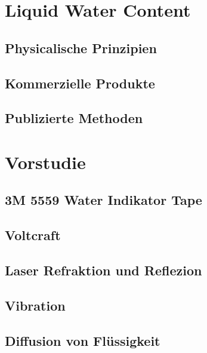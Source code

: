 \documentclass[a4paper,12pt]{article}
\begin{document}
\section{Liquid Water Content}
\subsection{Physicalische Prinzipien}

\subsection{Kommerzielle Produkte}

\subsection{Publizierte Methoden}
\label{sec:PubMeth}


\section{Vorstudie}

\subsection{3M 5559 Water Indikator Tape}


\subsection{Voltcraft}


\subsection{Laser Refraktion und Reflezion}


\subsection{Vibration}


\subsection{Diffusion von Flüssigkeit}
\label{sec:TinteVersuchsaufbau}

\end{document}
